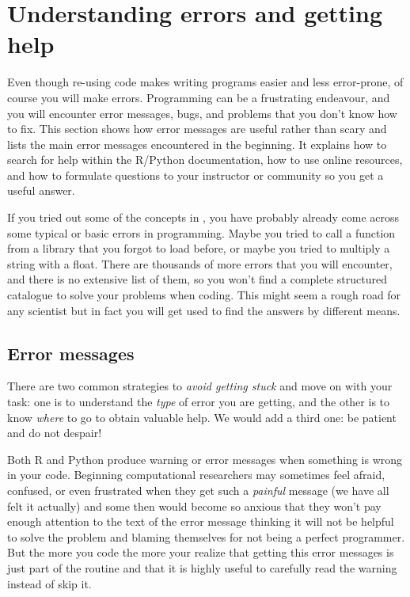 \section{Understanding errors and getting help}
\label{sec:errors}

Even though re-using code makes writing programs easier and less error-prone, of course you will make errors. 
Programming can be a frustrating endeavour, and you will encounter error messages, bugs, and problems that you don’t know how to fix. This section shows how error messages are useful rather than scary and lists the main error messages encountered in the beginning. It explains how to search for help within the R/Python documentation, how to use online resources, and how to formulate questions to your instructor or community so you get a useful answer. 

If you tried out some of the concepts in , you have probably already come across some typical or basic errors in programming. Maybe you tried to call a function from a library that you forgot to load before, or maybe you tried to multiply a string with a float.
There are thousands of more errors that you will encounter, and there is no extensive list of them, so you won't find a complete structured catalogue to solve your problems when coding. This might seem a rough road for any scientist but in fact you will get used to find the answers by different means.

\subsection{Error messages}


There are two common strategies to \textit{avoid getting stuck} and move on with your task: one is to understand the \textit{type} of error you are getting, and the other is to know \textit{where} to go to obtain valuable help. We would add a third one: be patient and do not despair!

Both R and Python produce warning or error messages when something is wrong in your code. Beginning computational researchers may sometimes feel afraid, confused, or even frustrated when they get such a \textit{painful} message (we have all felt it actually) and some then would become so anxious that they won't pay enough attention to the text of the error message thinking it will not be helpful to solve the problem and blaming themselves for not being a perfect programmer. But the more you code the more your realize that getting this error messages is just part of the routine and that it is highly useful to carefully read the warning instead of skip it.

